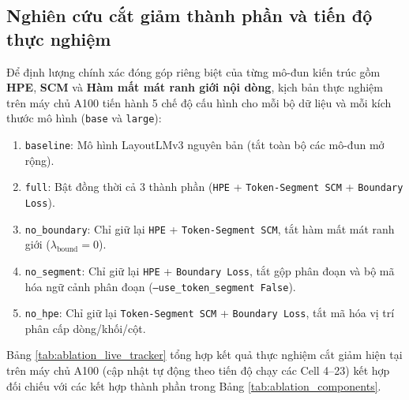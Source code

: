 \subsection{Nghiên cứu cắt giảm thành phần và tiến độ thực nghiệm}
Để định lượng chính xác đóng góp riêng biệt của từng mô-đun kiến trúc gồm \textbf{HPE}, \textbf{SCM} và \textbf{Hàm mất mát ranh giới nội dòng}, kịch bản thực nghiệm trên máy chủ A100 tiến hành 5 chế độ cấu hình cho mỗi bộ dữ liệu và mỗi kích thước mô hình (\texttt{base} và \texttt{large}):
\begin{enumerate}
    \item \texttt{baseline}: Mô hình LayoutLMv3 nguyên bản (tắt toàn bộ các mô-đun mở rộng).
    \item \texttt{full}: Bật đồng thời cả 3 thành phần (\texttt{HPE} + \texttt{Token-Segment SCM} + \texttt{Boundary Loss}).
    \item \texttt{no\_boundary}: Chỉ giữ lại \texttt{HPE} + \texttt{Token-Segment SCM}, tắt hàm mất mát ranh giới ($\lambda_{\text{bound}} = 0$).
    \item \texttt{no\_segment}: Chỉ giữ lại \texttt{HPE} + \texttt{Boundary Loss}, tắt gộp phân đoạn và bộ mã hóa ngữ cảnh phân đoạn (\texttt{--use\_token\_segment False}).
    \item \texttt{no\_hpe}: Chỉ giữ lại \texttt{Token-Segment SCM} + \texttt{Boundary Loss}, tắt mã hóa vị trí phân cấp dòng/khối/cột.
\end{enumerate}

Bảng \ref{tab:ablation_live_tracker} tổng hợp kết quả thực nghiệm cắt giảm hiện tại trên máy chủ A100 (cập nhật tự động theo tiến độ chạy các Cell 4--23) kết hợp đối chiếu với các kết hợp thành phần trong Bảng \ref{tab:ablation_components}.

